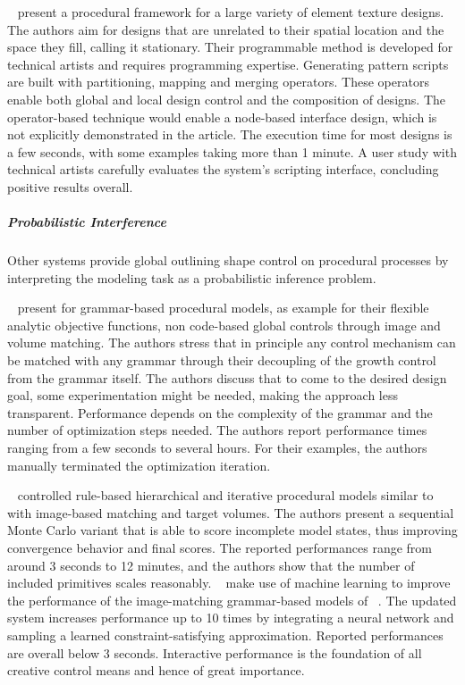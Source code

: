 \citeauthor*{loi_2017_pae}~\cite{loi_2017_pae} present a procedural framework for a large variety of element texture designs. The authors aim for designs that are unrelated to their spatial location and the space they fill, calling it stationary. Their programmable method is developed for technical artists and requires programming expertise. Generating pattern scripts are built with partitioning, mapping and merging operators. These operators enable both global and local design control and the composition of designs. The operator-based technique would enable a node-based interface design, which is not explicitly demonstrated in the article. The execution time for most designs is a few seconds, with some examples taking more than 1 minute. A user study with technical artists carefully evaluates the system's scripting interface, concluding positive results overall.



\subparagraph{Probabilistic Interference}
\label{subara:analysis_rulebased_shapes_probabilistic}

Other systems provide global outlining shape control on procedural processes by interpreting the modeling task as a probabilistic inference problem.

\citeauthor*{talton_2011_mpm}~\cite{talton_2011_mpm} present for grammar-based procedural models, as example for their flexible analytic objective functions, non code-based global controls through image and volume matching. The authors stress that in principle any control mechanism can be matched with any grammar through their decoupling of the growth control from the grammar itself. The authors discuss that to come to the desired design goal, some experimentation might be needed, making the approach less transparent. Performance depends on the complexity of the grammar and the number of optimization steps needed. The authors report performance times ranging from a few seconds to several hours. For their examples, the authors manually terminated the optimization iteration.

\citeauthor*{ritchie_2015_cpm}~\cite{ritchie_2015_cpm} controlled rule-based hierarchical and iterative procedural models similar to \citeauthor*{talton_2011_mpm}~\cite{talton_2011_mpm} with image-based matching and target volumes. The authors present a sequential Monte Carlo variant that is able to score incomplete model states, thus improving convergence behavior and final scores. The reported performances range from around 3 seconds to 12 minutes, and the authors show that the number of included primitives scales reasonably. \citeauthor*{ritchie_2016_ngp}~\cite{ritchie_2016_ngp} make use of machine learning to improve the performance of the image-matching grammar-based models of \citeauthor*{ritchie_2015_cpm}~\cite{ritchie_2015_cpm}. The updated system increases performance up to 10 times by integrating a neural network and sampling a learned constraint-satisfying approximation. Reported performances are overall below 3 seconds. Interactive performance is the foundation of all creative control means and hence of great importance.

